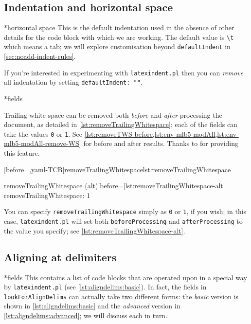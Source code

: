 
\subsection{Indentation and horizontal space}
*{horizontal space}
	This is the default indentation used in the absence of other details for the code block
	with which we are working. The default value is \lstinline!\t! which means a tab; we will
	explore customisation beyond \texttt{defaultIndent} in \vref{sec:noadd-indent-rules}.

	If you're interested in experimenting with \texttt{latexindent.pl} then you can
	\emph{remove} all indentation by setting \texttt{defaultIndent: ""}.

*{fields}\label{yaml:removeTrailingWhitespace}

	Trailing white space can be removed both \emph{before} and \emph{after} processing the
	document, as detailed in \cref{lst:removeTrailingWhitespace}; each of the fields can take
	the values \texttt{0} or \texttt{1}. See
	\vref{lst:removeTWS-before,lst:env-mlb5-modAll,lst:env-mlb5-modAll-remove-WS} for before
	and after results. Thanks to \cite{vosskuhle} for providing this feature.

	\begin{minipage}{.4\textwidth}
		[before=\centering,yaml-TCB]{removeTrailingWhitespace}{lst:removeTrailingWhitespace}
	\end{minipage}%
	\hfill
	\begin{minipage}{.5\textwidth}
		\begin{yaml}[numbers=none]{removeTrailingWhitespace (alt)}[before=\centering]{lst:removeTrailingWhitespace-alt}
removeTrailingWhitespace: 1
\end{yaml}
	\end{minipage}%

	You can specify \texttt{removeTrailingWhitespace} simply as \texttt{0} or \texttt{1}, if
	you wish; in this case,%
	 \texttt{latexindent.pl} will set both
	\texttt{beforeProcessing} and \texttt{afterProcessing} to the value you specify; see
	\cref{lst:removeTrailingWhitespace-alt}.

\subsection{Aligning at delimiters}
*{fields}
	This contains a list of code blocks that are operated upon in a special way by
	\texttt{latexindent.pl} (see \cref{lst:aligndelims:basic}). In fact, the fields in
	\texttt{lookForAlignDelims} can actually take two different forms: the \emph{basic}
	version is shown in \cref{lst:aligndelims:basic} and the \emph{advanced} version in
	\cref{lst:aligndelims:advanced}; we will discuss each in turn.

